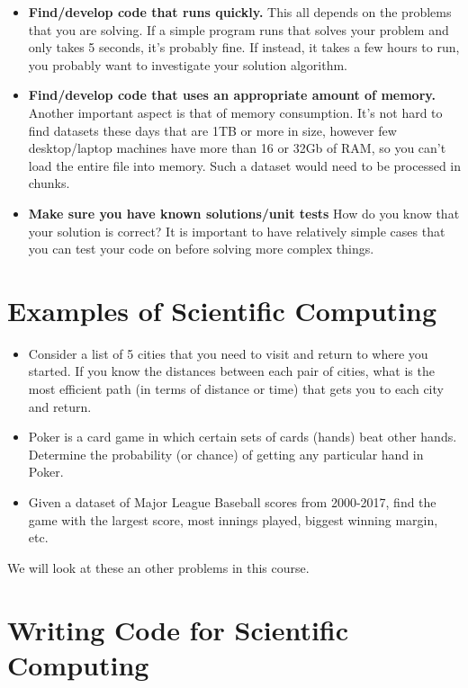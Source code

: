 \begin{itemize}
\item
  \textbf{Find/develop code that runs quickly.} This all depends on the
  problems that you are solving. If a simple program runs that solves
  your problem and only takes 5 seconds, it's probably fine. If instead,
  it takes a few hours to run, you probably want to investigate your
  solution algorithm.
\item
  \textbf{Find/develop code that uses an appropriate amount of memory.}
  Another important aspect is that of memory consumption. It's not hard
  to find datasets these days that are 1TB or more in size, however few
  desktop/laptop machines have more than 16 or 32Gb of RAM, so you can't
  load the entire file into memory. Such a dataset would need to be
  processed in chunks.
\item
  \textbf{Make sure you have known solutions/unit tests} How do you know
  that your solution is correct? It is important to have relatively
  simple cases that you can test your code on before solving more
  complex things.
\end{itemize}

\hypertarget{examples-of-scientific-computing}{%
\section{Examples of Scientific
Computing}\label{examples-of-scientific-computing}}

\begin{itemize}
\item
  Consider a list of 5 cities that you need to visit and return to where
  you started. If you know the distances between each pair of cities,
  what is the most efficient path (in terms of distance or time) that
  gets you to each city and return.
\item
  Poker is a card game in which certain sets of cards (hands) beat other
  hands. Determine the probability (or chance) of getting any particular
  hand in Poker.
\item
  Given a dataset of Major League Baseball scores from 2000-2017, find
  the game with the largest score, most innings played, biggest winning
  margin, etc.
\end{itemize}

We will look at these an other problems in this course.

\hypertarget{writing-code-for-scientific-computing}{%
\section{Writing Code for Scientific
Computing}\label{writing-code-for-scientific-computing}}

